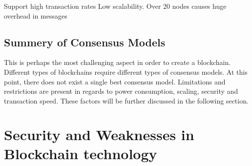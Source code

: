 Support high transaction rates
Low scalability. Over 20 nodes causes huge overhead in messages 


 
 
 \subsection{Summery of Consensus Models}
This is perhaps the most challenging aspect in order to create a blockchain. Different types of blockchains require different types of consensus models.  
At this point, there does not exist a single best consensus model. Limitations and restrictions are present in regards to power consumption, scaling, security and transaction speed. These factors will be further discussed in the following section. 

\section{Security and Weaknesses in Blockchain technology}



